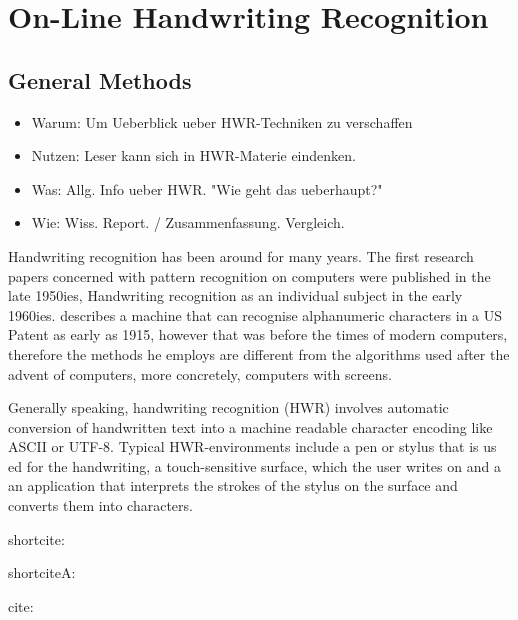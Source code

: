 
\chapter{On-Line Handwriting Recognition}
\label{chap:onlinehwr}
  
\section{General Methods}
\label{sec:generalmethods}

\begin{itemize}
\item Warum: Um Ueberblick ueber HWR-Techniken zu verschaffen
\item Nutzen: Leser kann sich in HWR-Materie eindenken.
\item Was: Allg. Info ueber HWR. "Wie geht das ueberhaupt?"
\item Wie: Wiss. Report. / Zusammenfassung. Vergleich.
\end{itemize}

Handwriting recognition has been around for many years. The first research
papers concerned with pattern recognition on computers were published in
the late 1950ies, Handwriting recognition as an individual subject in 
the early 1960ies.  describes a machine that can
recognise alphanumeric characters in a US Patent as early as 1915, 
however that was before the times of modern computers, 
therefore the methods he employs are different from the algorithms used
after the advent of computers, more concretely, computers with screens.

Generally speaking, handwriting recognition (HWR) involves automatic 
conversion of handwritten text into a machine readable character encoding
like ASCII or UTF-8. Typical HWR-environments include a pen or stylus that is us
ed for the handwriting, a touch-sensitive surface, which the user writes on
and a an application that interprets the strokes of the stylus on the surface
and converts them into characters.







shortcite:  

shortciteA:  



cite: \cite{Tappert1990} 

